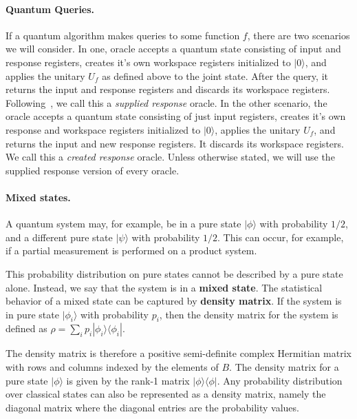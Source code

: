 \paragraph{Quantum Queries.} If a quantum algorithm makes queries to some function $f$, there are two scenarios we will consider.  In one, oracle accepts a quantum state consisting of input and response registers, creates it's own workspace registers initialized to $|0\rangle$, and applies the unitary $U_f$ as defined above to the joint state.  After the query, it returns the input and response registers and discards its workspace registers.  Following~\cite{ICITS:DFNS13}, we call this a \emph{supplied response} oracle.  In the other scenario, the oracle accepts a quantum state consisting of just input registers, creates it's own response and workspace registers initialized to $|0\rangle$, applies the unitary $U_f$, and returns the input and new response registers.  It discards its workspace registers.  We call this a \emph{created response} oracle.  Unless otherwise stated, we will use the supplied response version of every oracle.
\vspace{-0.6em}
\paragraph{Mixed states.} A quantum system may, for example, be in a pure state $|\phi\rangle$ with probability $1/2$, and a different pure state $|\psi\rangle$ with probability $1/2$.  This can occur, for example, if a partial measurement is performed on a product system.%

This probability distribution on pure states cannot be described by a pure state alone.  Instead, we say that the system is in a {\bf mixed state}.  The statistical behavior of a mixed state can be captured by {\bf density matrix}.  If the system is in pure state $|\phi_i\rangle$ with probability $p_i$, then the density matrix for the system is defined as $\rho=\sum_i p_i |\phi_i\rangle\langle\phi_i|$.

The density matrix is therefore a positive semi-definite complex  Hermitian matrix with rows and columns indexed by the elements of $B$.  The density matrix for a pure state $|\phi\rangle$ is given by the rank-1 matrix $|\phi\rangle\langle\phi|$.  Any probability distribution over classical states can also be represented as a density matrix, namely the diagonal matrix where the diagonal entries are the probability values.
\vspace{-0.6em}
